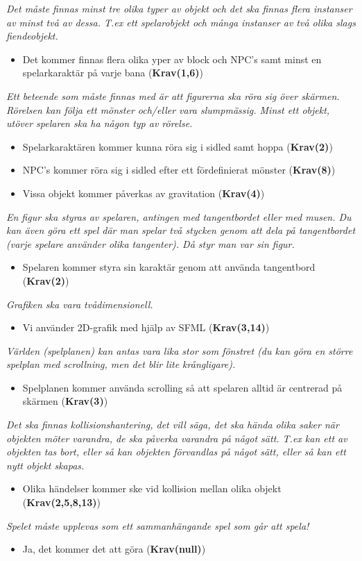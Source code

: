 \documentclass{TDP003mall}
\begin{document}
\noindent\textit{Det måste finnas minst tre olika typer av objekt och det ska finnas flera instanser av minst två av dessa.
T.ex ett spelarobjekt och många instanser av två olika slags fiendeobjekt.}
\begin{itemize}
\item Det kommer finnas flera olika yper av block och NPC's samt minst en spelarkaraktär på varje bana (\textbf{Krav(1,6)})
\end{itemize}

\noindent\textit{Ett beteende som måste finnas med är att figurerna ska röra sig över skärmen. Rörelsen kan följa ett
mönster och/eller vara slumpmässig. Minst ett objekt, utöver spelaren ska ha någon typ av rörelse.}
\begin{itemize}
\item Spelarkaraktären kommer kunna röra sig i sidled samt hoppa (\textbf{Krav(2)})
\item NPC's kommer röra sig i sidled efter ett fördefinierat mönster (\textbf{Krav(8)})
\item Vissa objekt kommer påverkas av gravitation (\textbf{Krav(4)})
\end{itemize}

\noindent\textit{En figur ska styras av spelaren, antingen med tangentbordet eller med musen. Du kan även göra ett spel där
man spelar två stycken genom att dela på tangentbordet (varje spelare använder olika tangenter). Då styr
man var sin figur.}
\begin{itemize}
\item Spelaren kommer styra sin karaktär genom att använda tangentbord (\textbf{Krav(2)})
\end{itemize}

\noindent\textit{Grafiken ska vara tvådimensionell.}
\begin{itemize}
\item Vi använder 2D-grafik med hjälp av SFML (\textbf{Krav(3,14)})
\end{itemize}

\noindent\textit{Världen (spelplanen) kan antas vara lika stor som fönstret (du kan göra en större spelplan med scrollning,
men det blir lite krångligare).}
\begin{itemize}
\item Spelplanen kommer använda scrolling så att spelaren alltid är centrerad på skärmen (\textbf{Krav(3)})
\end{itemize}

\textit{Det ska finnas kollisionshantering, det vill säga, det ska hända olika saker när objekten möter varandra, 
de ska påverka varandra på något sätt. T.ex kan ett av objekten tas bort, eller så kan objekten förvandlas på
något sätt, eller så kan ett nytt objekt skapas.}
\begin{itemize}
\item Olika händelser kommer ske vid kollision mellan olika objekt (\textbf{Krav(2,5,8,13)})
\end{itemize}

\noindent\textit{Spelet måste upplevas som ett sammanhängande spel som går att spela!}
\begin{itemize}
\item Ja, det kommer det att göra (\textbf{Krav(null)})
\end{itemize}
\end{document}

